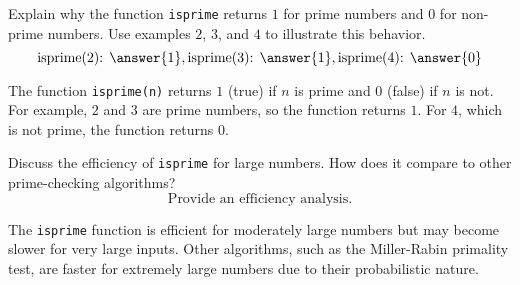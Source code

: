 \documentclass{ximera}
\author{Jont Allen}
\begin{document}
\begin{problem}
    Explain why the function \texttt{isprime} returns \(1\) for prime numbers and \(0\) for non-prime numbers.
    Use examples \(2\), \(3\), and \(4\) to illustrate this behavior.
    \[
    \text{isprime(2): } \answer{1}, \text{isprime(3): } \answer{1}, \text{isprime(4): } \answer{0}
    \]
    \begin{feedback}[correct]
    The function \texttt{isprime(n)} returns \(1\) (true) if \(n\) is prime and \(0\) (false) if \(n\) is not. For example, \(2\) and \(3\) are prime numbers, so the function returns \(1\). For \(4\), which is not prime, the function returns \(0\).
    \end{feedback}
\end{problem}

\begin{problem}
    Discuss the efficiency of \texttt{isprime} for large numbers. How does it compare to other prime-checking algorithms?
    \[
    \text{Provide an efficiency analysis.}
    \]
    \begin{feedback}[correct]
    The \texttt{isprime} function is efficient for moderately large numbers but may become slower for very large inputs. Other algorithms, such as the Miller-Rabin primality test, are faster for extremely large numbers due to their probabilistic nature.
    \end{feedback}
\end{problem}
\end{document}
